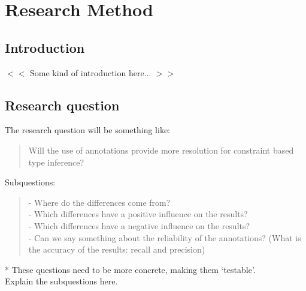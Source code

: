 \documentclass[../main.tex]{subfiles}
\begin{document}
    \chapter{Research Method}\label{chap:research_method}

    \section{Introduction}
    $<<$ Some kind of introduction here... $>>$

    \section{Research question}
    The research question will be something like: \\
    \begin{quote}
        Will the use of annotations\footnotemark{} provide more resolution for constraint based type inference?
    \end{quote}
    Subquestions:
    \begin{quote}
        - Where do the differences come from?
        \\
        - Which differences have a positive influence on the results?
        \\
        - Which differences have a negative influence on the results?
        \\
        - Can we say something about the reliability of the annotations? (What is the accuracy of the results: recall and precision)
    \end{quote}
    * These questions need to be more concrete, making them `testable'.
    \\
    Explain the subquestions here.
    
\end{document}
